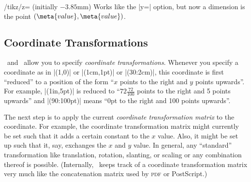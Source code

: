 \begin{key}{/tikz/z= (initially \normalfont$-3.85$mm)}
    Works like the |y=| option, but now a dimension is the point
    $(\meta{value},\meta{value})$.
\begin{codeexample}[]
\end{codeexample}
\end{key}


\subsection{Coordinate Transformations}

\pgfname\ and \tikzname\ allow you to specify \emph{coordinate
transformations}. Whenever you specify a coordinate as in |(1,0)| or
|(1cm,1pt)| or |(30:2cm)|, this coordinate is first ``reduced'' to a position
of the form ``$x$ points to the right and $y$ points upwards''. For example,
|(1in,5pt)| is reduced to ``$72\frac{72}{100}$ points to the right and 5 points
upwards'' and |(90:100pt)| means ``0pt to the right and 100 points upwards''.

The next step is to apply the current \emph{coordinate transformation matrix}
to the coordinate. For example, the coordinate transformation matrix might
currently be set such that it adds a certain constant to the $x$ value. Also,
it might be set up such that it, say, exchanges the $x$ and $y$ value. In
general, any ``standard'' transformation like translation, rotation, slanting,
or scaling or any combination thereof is possible. (Internally, \pgfname\ keeps
track of a coordinate transformation matrix very much like the concatenation
matrix used by \textsc{pdf} or PostScript.)
%
\begin{codeexample}[]
\end{codeexample}

